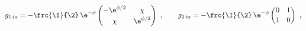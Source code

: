 \begin{equation}
  g_{1\,ia} = -\frc{\I}{\2}\, \e^{-\phi} \begin{pmatrix} -\e^{\phi/2} &
  \chi \\[2pt] \chi & \e^{\phi/2} \end{pmatrix}\ ,\qquad g_{2\,ia} = -
  \frc{\I}{\2}\, \e^{-\phi} \begin{pmatrix} 0 & 1 \\[2pt] 1 & 0
  \end{pmatrix}\ ,
 \end{equation}

